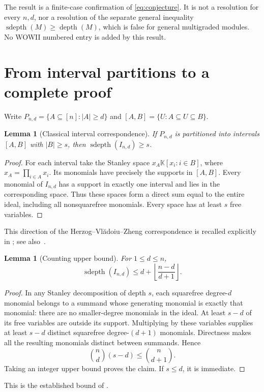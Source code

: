 \documentclass[11pt,a4paper]{article}
\newtheorem{lemma}[theorem]{Lemma}
\newcommand{\sd}{\operatorname{sdepth}}
\newcommand{\K}{\mathbb K}
\begin{document}
The result is a finite-case confirmation of \eqref{eq:conjecture}.
It is not a resolution for every $n,d$, nor a resolution of the separate
general inequality $\sd(M)\ge\operatorname{depth}(M)$, which is false
for general multigraded modules. No WOWII numbered entry is added by
this result.

\section{From interval partitions to a complete proof}
Write $P_{n,d}=\{A\subseteq[n]:|A|\ge d\}$ and
$[A,B]=\{U:A\subseteq U\subseteq B\}$.

\begin{lemma}[Classical interval correspondence]\label{lem:interval}
If $P_{n,d}$ is partitioned into intervals $[A,B]$ with $|B|\ge s$,
then $\sd(I_{n,d})\ge s$.
\end{lemma}
\begin{proof}
For each interval take the Stanley space
$x_A\K[x_i:i\in B]$, where $x_A=\prod_{i\in A}x_i$.
Its monomials have precisely the supports in $[A,B]$. Every monomial
of $I_{n,d}$ has a support in exactly one interval and lies in the
corresponding space. Thus these spaces form a direct sum equal to
the entire ideal, including all nonsquarefree monomials. Every space
has at least $s$ free variables.
\end{proof}
This direction of the Herzog--Vl\u{a}doiu--Zheng correspondence is
recalled explicitly in \cite[Section~2.1]{KSSY}; see also~\cite{HVZ}.

\begin{lemma}[Counting upper bound]\label{lem:upper}
For $1\le d\le n$,
\[
 \sd(I_{n,d})\le d+\left\lfloor\frac{n-d}{d+1}\right\rfloor.
\]
\end{lemma}
\begin{proof}
In any Stanley decomposition of depth $s$, each squarefree degree-$d$
monomial belongs to a summand whose generating monomial is exactly
that monomial: there are no smaller-degree monomials in the ideal.
At least $s-d$ of its free variables are outside its support. Multiplying
by these variables supplies at least $s-d$ distinct squarefree
degree-$(d+1)$ monomials. Directness makes all the resulting monomials
distinct between summands. Hence
\[
 \binom nd(s-d)\le\binom n{d+1}.
\]
Taking an integer upper bound proves the claim. If $s\le d$, it is
immediate.
\end{proof}
This is the established bound of \cite[Lemma~2.2]{KSSY}.
\end{document}
